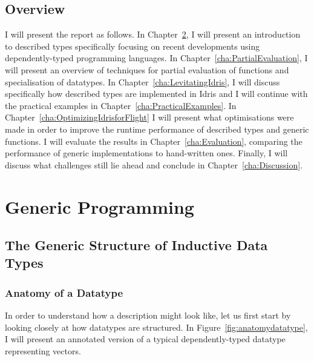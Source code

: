 \documentclass{ituthesis}
\begin{document}
\section{Overview}
\label{sec:Overview}
I will present the report as follows. In Chapter~\ref{cha:GenericProgramming}, I will present an introduction to described types specifically focusing on recent developments using dependently-typed programming languages.
In Chapter~\ref{cha:PartialEvaluation}, I will present an overview of techniques for partial evaluation of functions and specialisation of datatypes. In Chapter~\ref{cha:LevitatingIdris}, I will discuss specifically how described types are implemented in Idris and I will continue with the practical examples in Chapter~\ref{cha:PracticalExamples}.
In Chapter~\ref{cha:OptimizingIdrisforFlight} I will present what optimisations were made in order to improve the runtime performance of described types and generic functions. I will evaluate the results in Chapter~\ref{cha:Evaluation}, comparing the performance of generic implementations to hand-written ones.
Finally, I will discuss what challenges still lie ahead and conclude in Chapter~\ref{cha:Discussion}.
\chapter{Generic Programming}
\label{cha:GenericProgramming}
\section{The Generic Structure of Inductive Data Types}
\label{sec:TheGenericStructureofInductiveDataTypes}
\subsection{Anatomy of a Datatype}
\label{sub:AnatomyofaDatatype}
In order to understand how a description might look like, let us first start by looking closely at how datatypes are structured. In Figure~\ref{fig:anatomydatatype}, I will present an annotated version of a typical dependently-typed datatype representing vectors.
\end{document}
